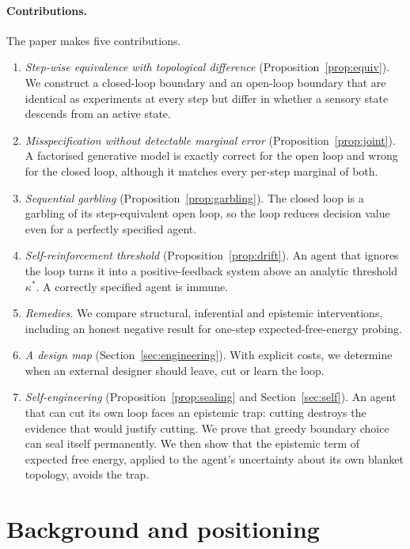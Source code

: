 \documentclass[11pt]{article}
\theoremstyle{definition}
\theoremstyle{remark}
\begin{document}
\paragraph{Contributions.} The paper makes five contributions.
\begin{enumerate}
\item \emph{Step-wise equivalence with topological difference}
      (Proposition~\ref{prop:equiv}). We construct a closed-loop boundary and an
      open-loop boundary that are identical as experiments at every step but
      differ in whether a sensory state descends from an active state.
\item \emph{Misspecification without detectable marginal error}
      (Proposition~\ref{prop:joint}). A factorised generative model is exactly
      correct for the open loop and wrong for the closed loop, although it
      matches every per-step marginal of both.
\item \emph{Sequential garbling} (Proposition~\ref{prop:garbling}). The closed
      loop is a garbling of its step-equivalent open loop, so the loop reduces
      decision value even for a perfectly specified agent.
\item \emph{Self-reinforcement threshold} (Proposition~\ref{prop:drift}). An
      agent that ignores the loop turns it into a positive-feedback system above
      an analytic threshold $\kappa^\ast$. A correctly specified agent is immune.
\item \emph{Remedies}. We compare structural, inferential and epistemic
      interventions, including an honest negative result for one-step
      expected-free-energy probing.
\item \emph{A design map} (Section~\ref{sec:engineering}). With explicit costs,
      we determine when an external designer should leave, cut or learn the
      loop.
\item \emph{Self-engineering} (Proposition~\ref{prop:sealing} and
      Section~\ref{sec:self}). An agent that can cut its own loop faces an
      epistemic trap: cutting destroys the evidence that would justify cutting.
      We prove that greedy boundary choice can seal itself permanently. We then
      show that the epistemic term of expected free energy, applied to the
      agent's uncertainty about its own blanket topology, avoids the trap.
\end{enumerate}

\section{Background and positioning}\label{sec:background}
\end{document}
